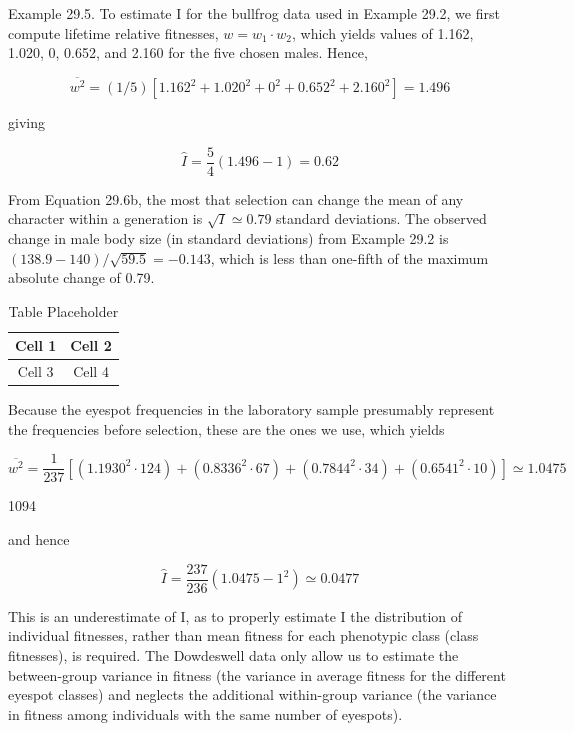 \documentclass{article}
\begin{document}
Example 29.5. To estimate I for the bullfrog data used in Example 29.2, we first compute lifetime relative fitnesses,  $ w = w_1 \cdot w_2 $, which yields values of 1.162, 1.020, 0, 0.652, and 2.160 for the five chosen males. Hence,

\begin{equation}
\overline{w^{2}}=\left(1/5\right)\left[1.162^{2}+1.020^{2}+0^{2}+0.652^{2}+2.160^{2}\right]=1.496
\end{equation}

giving

\begin{equation}
\widehat{I}=\frac{5}{4}(1.496-1)=0.62
\end{equation}

From Equation 29.6b, the most that selection can change the mean of any character within a generation is  $ \sqrt{I} \simeq 0.79 $ standard deviations. The observed change in male body size (in standard deviations) from Example 29.2 is  $ (138.9 - 140)/\sqrt{59.5} = -0.143 $, which is less than one-fifth of the maximum absolute change of 0.79.

\begin{table}[h]
\centering
\begin{tabular}{|c|c|}
\hline
Cell 1 & Cell 2 \\
\hline
Cell 3 & Cell 4 \\
\hline
\end{tabular}
\caption{Table Placeholder}
\end{table}

Because the eyespot frequencies in the laboratory sample presumably represent the frequencies before selection, these are the ones we use, which yields

\begin{equation}
\overline{w^{2}}=\frac{1}{237}\left[\left(1.1930^{2}\cdot124\right)+\left(0.8336^{2}\cdot67\right)+\left(0.7844^{2}\cdot34\right)+\left(0.6541^{2}\cdot10\right)\right]\simeq1.0475
\end{equation}

1094

and hence

\begin{equation}
\widehat{I}=\frac{237}{236}\left(1.0475-1^{2}\right)\simeq0.0477
\end{equation}

This is an underestimate of I, as to properly estimate I the distribution of individual fitnesses, rather than mean fitness for each phenotypic class (class fitnesses), is required. The Dowdeswell data only allow us to estimate the between-group variance in fitness (the variance in average fitness for the different eyespot classes) and neglects the additional within-group variance (the variance in fitness among individuals with the same number of eyespots).
\end{document}
